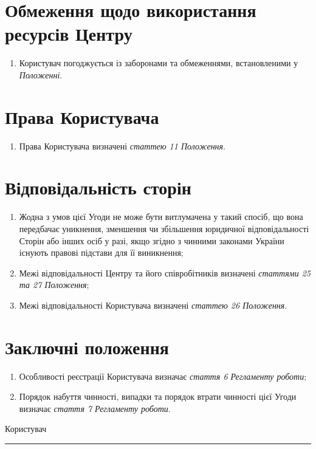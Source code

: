     \section {Обмеження щодо використання ресурсів Центру}
    \begin{enumerate}
        \item Користувач погоджується із заборонами та обмеженнями, встановленими у \textit{Положенні}.
    \end{enumerate}
%
    \section {Права Користувача}
    \begin{enumerate}
        \item Права Користувача визначені \textit{статтею 11 Положення}.
    \end{enumerate}
%
    \section {Відповідальність сторін}
    \begin{enumerate}
     cm
    \item Жодна з умов цієї Угоди не може бути витлумачена у такий спосіб, що вона передбачає уникнення, зменшення чи
    збільшення юридичної відповідальності Сторін або інших осіб у разі, якщо згідно з чинними законами України існують
    правові підстави для її виникнення; 
    \item Межі відповідальності Центру та його співробітників визначені \textit{статтями 25 та 27 Положення}; 
    \item Межі відповідальності Користувача визначені \textit{статтею 26 Положення}.
    \end{enumerate}
%
    \section {Заключні положення}
    \begin{enumerate}
     cm
    \item Особливості реєстрації Користувача визначає \textit{стаття 6 Регламенту роботи}; 
    \item Порядок набуття чинності, випадки та порядок втрати чинності цієї Угоди визначає \textit{стаття 7 Регламенту роботи}.
    \end{enumerate}
%
    \vfill
    \hspace {0.8\textwidth}
    \parbox{0.2\textwidth}{Користувач\\ \hrule}